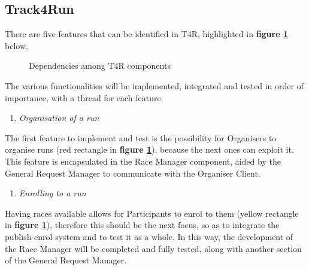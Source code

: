\subsection{Track4Run}
    There are five features that can be identified in T4R, highlighted in \textbf{figure \ref{fig:T4R_DependencyDiagram}} below.
    
    \begin{figure}[h]
        \centering
        \caption{Dependencies among T4R components}
        \label{fig:T4R_DependencyDiagram}
    \end{figure}

    The various functionalities will be implemented, integrated and tested in order of importance, with a thread for each feature. 
    
    \begin{enumerate}
        \item \emph{Organisation of a run}
    \end{enumerate}
    The first feature to implement and test is the possibility for Organisers to organise runs (red rectangle in \textbf{figure \ref{fig:T4R_DependencyDiagram}}), because the next ones can exploit it. This feature is encapsulated in the Race Manager component, aided by the General Request Manager to communicate with the Organiser Client.
    
    \begin{enumerate} [resume]
        \item \emph{Enrolling to a run}
    \end{enumerate}
    Having races available allows for Participants to enrol to them (yellow rectangle in \textbf{figure \ref{fig:T4R_DependencyDiagram}}), therefore this should be the next focus, so as to integrate the publish-enrol system and to test it as a whole. In this way, the development of the Race Manager will be completed and fully tested, along with another section of the General Request Manager.
    
